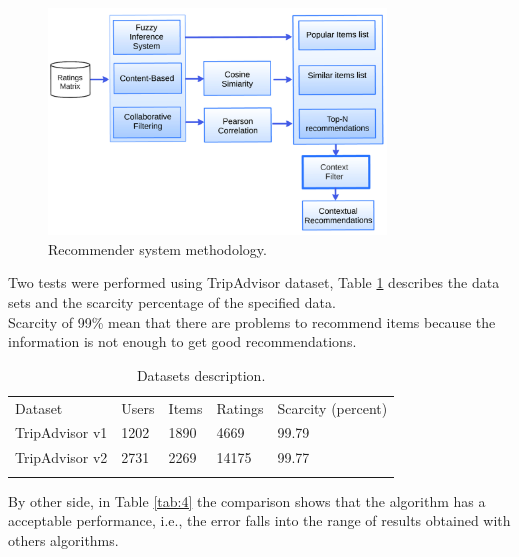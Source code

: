 \begin{figure}
\captionsetup{font=footnotesize}
\centering
\includegraphics[width=0.80\textwidth]{img/archit-ta.png}
\caption{Recommender system methodology.}
\label{fig:architecture}   
\end{figure}
Two tests were performed using TripAdvisor dataset, 
Table  \ref{tab:3} describes the data sets and the scarcity percentage of the
specified data. \\ Scarcity of 99\% mean that there are problems to
recommend items because the information is not enough to get 
good recommendations.
\begin{table}
\centering
\small
\captionsetup{font=footnotesize}
\caption{Datasets description.}
\label{tab:3}      
\begin{tabular}{lllll}
\hline\noalign{\smallskip}
Dataset & Users & Items & Ratings & Scarcity (percent) \\
\noalign{\smallskip}\hline\noalign{\smallskip}
TripAdvisor v1 & 1202 & 1890 & 4669 & 99.79 \\
TripAdvisor v2 & 2731 & 2269 & 14175 & 99.77 \\
\noalign{\smallskip}\hline
\end{tabular}
\end{table}
By other side, in Table  \ref{tab:4} the comparison
shows that the algorithm has a acceptable performance, i.e., the error
falls into the range of results obtained with others algorithms. 

